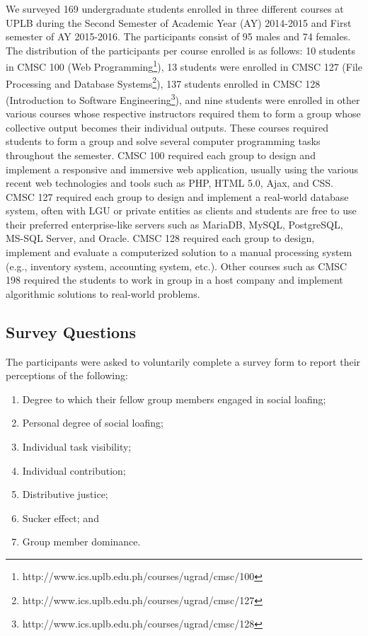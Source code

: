 \documentclass[a4paper,a4paper,BCOR12mm,12pt,abstracton,pointednumbers,tablecaptionabove,footinclude,halfparskip,normalheadings,]{scrartcl}
\begin{document}
We surveyed 169 undergraduate students enrolled in three different courses at UPLB during the Second Semester of Academic Year (AY) 2014-2015 and First semester of AY 2015-2016. The participants consist of 95 males and 74 females. The distribution of the participants per course enrolled is as follows: 10 students in CMSC 100 (Web Programming\footnote{http://www.ics.uplb.edu.ph/courses/ugrad/cmsc/100}), 13 students were enrolled in CMSC 127 (File Processing and Database Systems\footnote{http://www.ics.uplb.edu.ph/courses/ugrad/cmsc/127}), 137 students enrolled in CMSC 128 (Introduction to Software Engineering\footnote{http://www.ics.uplb.edu.ph/courses/ugrad/cmsc/128}), and nine students were enrolled in other various courses whose respective instructors required them to form a group whose collective output becomes their individual outputs. These courses required students to form a group and solve several computer programming tasks throughout the semester. CMSC 100 required each group to design and implement a responsive and immersive web application, usually using the various recent web technologies and tools such as PHP, HTML 5.0, Ajax, and CSS. CMSC 127 required each group to design and implement a real-world database system, often with LGU or private entities as clients and students are free to use their preferred enterprise-like servers such as MariaDB, MySQL, PostgreSQL, MS-SQL Server, and Oracle. CMSC 128  required each group to design, implement and evaluate a computerized solution to a manual processing system (e.g., inventory system, accounting system, etc.). Other courses such as CMSC 198 required the students to work in group in a host company and implement algorithmic solutions to real-world problems. 

\subsection{Survey Questions}

The participants were asked to voluntarily complete a survey form to report their perceptions of the following: 
\begin{enumerate}
\item Degree to which their fellow group members engaged in social loafing; 
\item Personal degree of social loafing; 
\item Individual task visibility; 
\item Individual contribution; 
\item Distributive justice; 
\item Sucker effect; and 
\item Group member dominance. 
\end{enumerate}
\end{document}
